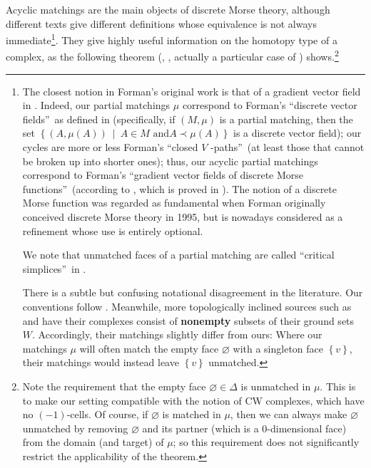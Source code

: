 \documentclass[12pt]{amsart}
\theoremstyle{definition}
\newcommand{\set}[1]{\left\{ #1 \right\}}
\begin{document}
Acyclic matchings are the main objects of discrete Morse theory, although
different texts give different definitions whose equivalence is not always
immediate\footnote{The closest notion in Forman's original work is that of a
gradient vector field in \cite[\S 3]{Forman-user}. Indeed, our partial
matchings $\mu$ correspond to Forman's \textquotedblleft discrete vector
fields\textquotedblright\ as defined in \cite[Definition 3.3]{Forman-user}
(specifically, if $\left(  M,\mu\right)  $ is a partial matching, then the set
$\left\{  \left(  A,\mu\left(  A\right)  \right)  \ \mid\ A\in M\text{ and
}A\prec\mu\left(  A\right)  \right\}  $ is a discrete vector field); our
cycles are more or less Forman's \textquotedblleft closed $V$%
-paths\textquotedblright\ (at least those that cannot be broken up into
shorter ones); thus, our acyclic partial matchings correspond to Forman's
\textquotedblleft gradient vector fields of discrete Morse
functions\textquotedblright\ (according to \cite[Theorem 3.5]{Forman-user},
which is proved in \cite[Proposition 14.11]{Kozlov20}). The notion of a
discrete Morse function was regarded as fundamental when Forman originally
conceived discrete Morse theory in 1995, but is nowadays considered as a
refinement whose use is entirely optional.
\par
We note that unmatched faces of a partial matching are called
\textquotedblleft critical simplices\textquotedblright\ in \cite{Forman-user}%
.
\par
There is a subtle but confusing notational disagreement in
the literature. Our conventions follow \cite{Kozlov20}. Meanwhile, more
topologically inclined sources such as \cite{Forman-user} and
\cite{Bjo} have their complexes consist of \textbf{nonempty} subsets of
their ground sets $W$. Accordingly, their matchings slightly differ from ours:
Where our matchings $\mu$ will often match the empty face $\varnothing$
with a singleton face $\set{v}$, their matchings would instead leave
$\set{v}$ unmatched.
}. They give highly useful information on the homotopy type of a complex, as
the following theorem (\cite[Theorem 2.5]{Forman-user}, \cite[Theorem
11.2]{Kozlov20}, actually a particular case of \cite[Proposition 1]{Brown92})
shows.\footnote{Note the requirement that the empty face $\varnothing
\in \Delta$ is unmatched in $\mu$. This is to make our setting compatible
with the notion of CW complexes, which have no $\left(-1\right)$-cells.
Of course, if $\varnothing$ is matched in $\mu$, then we can always make
$\varnothing$ unmatched by removing $\varnothing$ and its partner
(which is a $0$-dimensional face) from the domain (and target) of $\mu$;
so this requirement does not significantly restrict the applicability of
the theorem.}
\end{document}
